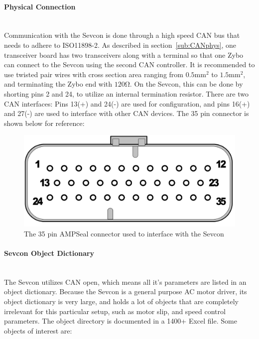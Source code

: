 

\paragraph*{Physical Connection}\label{sub:sevcon_physical_connection}~\\
Communication with the Sevcon is done through a high speed CAN bus that needs to adhere to ISO11898-2.
As described in section~\ref{sub:CANphys}, one transceiver board has two transceivers along with a terminal so that one Zybo can connect to the Sevcon using the second CAN controller.
It is recommended to use twisted pair wires with cross section area ranging from $0.5 \si{\milli \meter \squared}$ to $1.5 \si{\milli \meter \squared}$, and terminating the Zybo end with $120 \si{\ohm}$.
On the Sevcon, this can be done by shorting pins 2 and 24, to utilize an internal termination resistor.
There are two CAN interfaces: Pins 13(+) and 24(-) are used for configuration, and pins 16(+) and 27(-) are used to interface with other CAN devices.
The 35 pin connector is shown below for reference:

\begin{figure}[h]
	\centering
	\includegraphics[width = 0.6\linewidth]{graphics/35_pin_dsub}
	\caption{The 35 pin AMPSeal connector used to interface with the Sevcon}
	\label{fig:35_pin_dsub}
\end{figure}

\paragraph*{Sevcon Object Dictionary}\label{sub:sevcon_object_dictionary}~\\
The Sevcon utilizes CAN open, which means all it's parameters are listed in an object dictionary.
Because the Sevcon is a general purpose AC motor driver, its object dictionary is very large, and holds a lot of objects that are completely irrelevant for this particular setup, such as motor slip, and speed control parameters. 
The object directory is documented in a 1400+ Excel file. 
Some objects of interest are:

